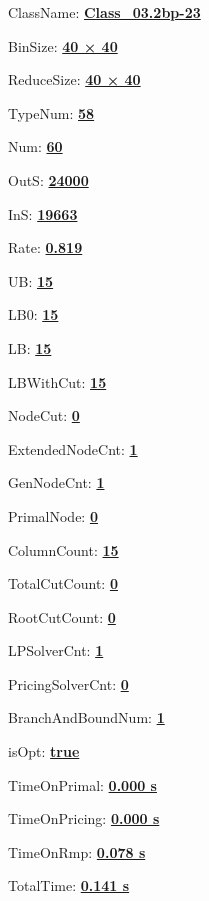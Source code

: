\documentclass[11pt]{article}
\begin{document}
\pagestyle{empty}


ClassName: \underline{\textbf{Class_03.2bp-23}}
\par
BinSize: \underline{\textbf{40 × 40}}
\par
ReduceSize: \underline{\textbf{40 × 40}}
\par
TypeNum: \underline{\textbf{58}}
\par
Num: \underline{\textbf{60}}
\par
OutS: \underline{\textbf{24000}}
\par
InS: \underline{\textbf{19663}}
\par
Rate: \underline{\textbf{0.819}}
\par
UB: \underline{\textbf{15}}
\par
LB0: \underline{\textbf{15}}
\par
LB: \underline{\textbf{15}}
\par
LBWithCut: \underline{\textbf{15}}
\par
NodeCut: \underline{\textbf{0}}
\par
ExtendedNodeCnt: \underline{\textbf{1}}
\par
GenNodeCnt: \underline{\textbf{1}}
\par
PrimalNode: \underline{\textbf{0}}
\par
ColumnCount: \underline{\textbf{15}}
\par
TotalCutCount: \underline{\textbf{0}}
\par
RootCutCount: \underline{\textbf{0}}
\par
LPSolverCnt: \underline{\textbf{1}}
\par
PricingSolverCnt: \underline{\textbf{0}}
\par
BranchAndBoundNum: \underline{\textbf{1}}
\par
isOpt: \underline{\textbf{true}}
\par
TimeOnPrimal: \underline{\textbf{0.000 s}}
\par
TimeOnPricing: \underline{\textbf{0.000 s}}
\par
TimeOnRmp: \underline{\textbf{0.078 s}}
\par
TotalTime: \underline{\textbf{0.141 s}}
\par
\newpage


\end{document}
